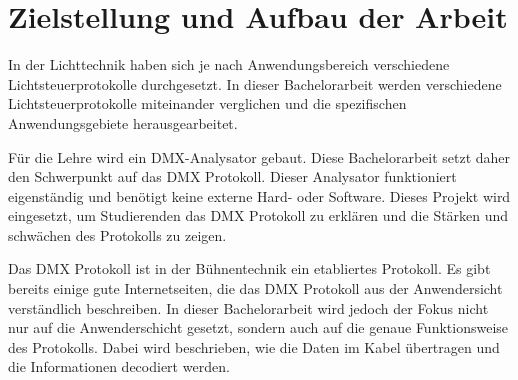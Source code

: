 \chapter{Zielstellung und Aufbau der Arbeit}

In der Lichttechnik haben sich je nach Anwendungsbereich verschiedene Lichtsteuerprotokolle durchgesetzt. In dieser Bachelorarbeit werden verschiedene Lichtsteuerprotokolle miteinander verglichen und die spezifischen Anwendungsgebiete herausgearbeitet.

Für die Lehre wird ein DMX-Analysator gebaut. Diese Bachelorarbeit setzt daher den Schwerpunkt auf das DMX Protokoll. Dieser Analysator funktioniert eigenständig und benötigt keine externe Hard- oder Software. Dieses Projekt wird eingesetzt, um Studierenden das DMX Protokoll zu erklären und die Stärken und schwächen des Protokolls zu zeigen.

Das DMX Protokoll ist in der Bühnentechnik ein etabliertes Protokoll. Es gibt bereits einige gute Internetseiten, die das DMX Protokoll aus der Anwendersicht verständlich beschreiben. In dieser Bachelorarbeit wird jedoch der Fokus nicht nur auf die Anwenderschicht gesetzt, sondern auch auf die genaue Funktionsweise des Protokolls. Dabei wird beschrieben, wie die Daten im Kabel übertragen und die Informationen decodiert werden.